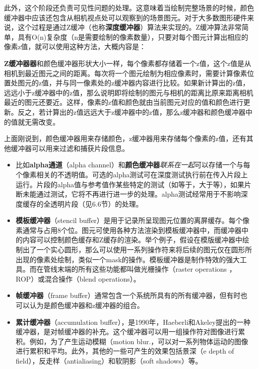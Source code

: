 \documentclass[UTF8,a4paper,12pt]{ctexbook}
\begin{document}
				此外，这个阶段还负责可见性问题的处理。这意味着当绘制完整场景的时候，颜色缓冲器中应该还包含从相机视点处可以观察到的场景图元。对于大多数图形硬件来说，这个过程是通过Z缓冲（也称\textbf{深度缓冲器}）算法来实现的。Z缓冲算法非常简单，具有O(n)复杂度（n是需要绘制的像素数量），只要对每个图元计算出相应的像素z值，就可以使用这种方法，大概内容是：
				
				\textbf{Z缓冲器器}和颜色缓冲器形状大小一样，每个像素都存储着一个z值，这个z值是从相机到最近图元之间的距离。每次将一个图元绘制为相应像素时，需要计算像素位置处图元的z值，并与同一像素处的z缓冲器内容进行比较。如果新计算出的z值，远远小于z缓冲器中的z值，那么说明即将绘制的图元与相机的距离比原来距离相机最近的图元还要近。这样，像素的z值和颜色就由当前图元对应的值和颜色进行更新。反之，若计算出的z值远远大于z缓冲器中的z值，那么z缓冲器和颜色缓冲器中的值就无需改变。
														
				上面刚说到，颜色缓冲器用来存储颜色，z缓冲器用来存储每个像素的z值，还有其他缓冲器可以用来过滤和捕获片段信息。
				
				\begin{itemize}	
					\item 比如\textbf{alpha通道}（alpha channel）和\textbf{颜色缓冲器}\textit{联系在一起}可以存储一个与每个像素相关的不透明值。可选的alpha测试可在深度测试执行前在传入片段上运行。片段的alpha值与参考值作某些特定的测试（如等于，大于等），如果片断未能通过测试，它将不再进行进一步的处理。alpha测试经常用于不影响深度缓存的全透明片段（见6.6节）的处理。
									
					\item \textbf{模板缓冲器}（stencil buffer）是用于记录所呈现图元位置的离屏缓存。每个像素通常与占用8个位。图元可使用各种方法渲染到模板缓冲器中，而缓冲器中的内容可以控制颜色缓存和Z缓存的渲染。举个例子，假设在模版缓冲器中绘制出了一个实心圆形，那么可以使用一系列操作符来将后续的图元仅在圆形所出现的像素处绘制，类似一个mask的操作。模板缓冲器是制作特效的强大工具。而在管线末端的所有这些功能都叫做光栅操作（raster operations ，ROP）或混合操作（blend operations）。
									
					\item \textbf{帧缓冲器}（frame buffer）通常包含一个系统所具有的所有缓冲器，但有时也可以认为是颜色缓冲器和z缓冲器的组合。
									
					\item \textbf{累计缓冲器}（accumulation buffer），是1990年，Haeberli和Akeley提出的一种缓冲器，是对帧缓冲器的补充。这个缓冲器可以用一组操作符对图像进行累积。例如，为了产生运动模糊（motion blur.，可以对一系列物体运动的图像进行累积和平均。此外，其他的一些可产生的效果包括景深（e depth of field），反走样（antialiasing）和软阴影（soft shadows）等。
				\end{itemize}
\end{document}
